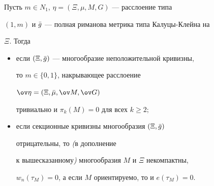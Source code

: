 \begin{thm} Пусть $m\in N_1$, $\eta=(\Xi,\mu,M,G)$ --- расслоение типа 


$(1,m)$ и $\Bar g$ --- полная риманова метрика типа Калуцы-Клейна на 


$\Xi$. Тогда 


\begin{itemize} 


\item[1)] если $(\Xi,\Bar g)$ --- многообразие неположительной кривизны, 


то $m\in\{0,1\}$, накрывающее расслоение 


$\ov\eta=(\Xi,\Bar\mu,\ov M,\ov G)$ 


тривиально и $\pi_k(M)=0$ для всех $k\ge 2;$ 


\item[2)] если секционные кривизны многообразия $(\Xi,\Bar g)$ 


отрицательны, то {\em (}в дополнение 


к вышесказанному{\em )} многообразия $M$ и $\Xi$ некомпактны, 


$w_n(\tau_M)=0$, а если $M$ ориентируемо, то и $e(\tau_M)=0$. 


\end{itemize} 


\end{thm} 


 


